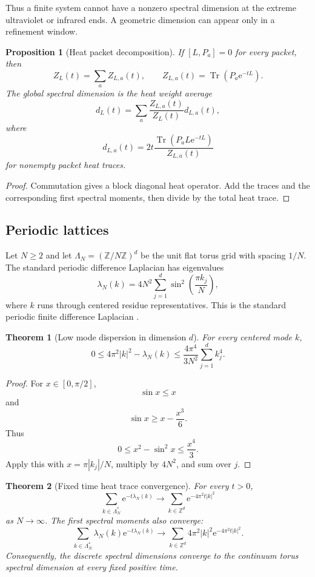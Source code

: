 \documentclass{aomart}
\newtheorem{theorem}{Theorem}[section]
\newtheorem{proposition}[proposition]{Proposition}
\theoremstyle{definition}
\theoremstyle{remark}
\newcommand{\ZZ}{\mathbb Z}
\newcommand{\Tr}{\operatorname{Tr}}
\newcommand{\e}{\mathrm e}
\newcommand{\abs}[1]{\left\lvert#1\right\rvert}
\begin{document}
Thus a finite system cannot have a nonzero spectral dimension at the extreme ultraviolet or infrared ends. A geometric dimension can appear only in a refinement window.

\begin{proposition}[Heat packet decomposition]\label{prop:heat_packets}
If \([L,P_a]=0\) for every packet, then
\[
Z_L(t)=\sum_aZ_{L,a}(t),
\qquad
Z_{L,a}(t)=\Tr(P_a\e^{-tL}).
\]
The global spectral dimension is the heat weight average
\[
d_L(t)
=
\sum_a
\frac{Z_{L,a}(t)}{Z_L(t)}
 d_{L,a}(t),
\]
where
\[
d_{L,a}(t)
=2t
\frac{\Tr(P_aL\e^{-tL})}{Z_{L,a}(t)}
\]
for nonempty packet heat traces.
\end{proposition}

\begin{proof}
Commutation gives a block diagonal heat operator. Add the traces and the corresponding first spectral moments, then divide by the total heat trace.
\end{proof}

\subsection{Periodic lattices}\label{subsec:periodic_lattices}

Let \(N\geq2\) and let \(\Lambda_N=(\ZZ/N\ZZ)^d\) be the unit flat torus grid with spacing \(1/N\). The standard periodic difference Laplacian has eigenvalues
\[
\lambda_N(k)
=
4N^2
\sum_{j=1}^{d}
\sin^2\left(\frac{\pi k_j}{N}\right),
\]
where \(k\) runs through centered residue representatives. This is the standard periodic finite difference Laplacian \cite{Strikwerda2004}.

\begin{theorem}[Low mode dispersion in dimension \(d\)]\label{thm:dispersion_bound}
For every centered mode \(k\),
\[
0
\leq
4\pi^2\abs{k}^2-\lambda_N(k)
\leq
\frac{4\pi^4}{3N^2}
\sum_{j=1}^{d}k_j^4.
\]
\end{theorem}

\begin{proof}
For \(x\in[0,\pi/2]\),
\[
\sin x\leq x
\]
and
\[
\sin x\geq x-\frac{x^3}{6}.
\]
Thus
\[
0\leq x^2-\sin^2x\leq\frac{x^4}{3}.
\]
Apply this with \(x=\pi\abs{k_j}/N\), multiply by \(4N^2\), and sum over \(j\).
\end{proof}

\begin{theorem}[Fixed time heat trace convergence]\label{thm:heat_trace_convergence}
For every \(t>0\),
\[
\sum_{k\in\Lambda_N^*}
\e^{-t\lambda_N(k)}
\longrightarrow
\sum_{k\in\ZZ^d}
\e^{-4\pi^2t\abs{k}^2}
\]
as \(N\to\infty\). The first spectral moments also converge:
\[
\sum_{k\in\Lambda_N^*}
\lambda_N(k)\e^{-t\lambda_N(k)}
\longrightarrow
\sum_{k\in\ZZ^d}
4\pi^2\abs{k}^2\e^{-4\pi^2t\abs{k}^2}.
\]
Consequently, the discrete spectral dimensions converge to the continuum torus spectral dimension at every fixed positive time.
\end{theorem}
\end{document}
